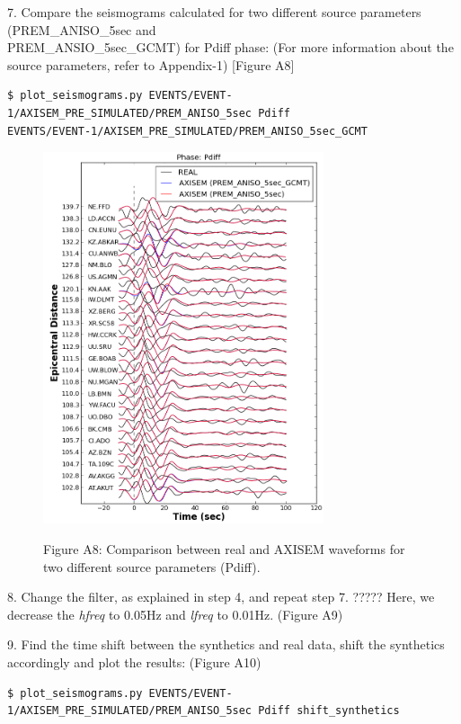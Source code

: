 \documentclass{article}
\begin{document}
7. Compare the seismograms calculated for two different source parameters (PREM\_ANISO\_5sec and \\
PREM\_ANSIO\_5sec\_GCMT) for Pdiff phase: (For more information about the source 
parameters, refer to Appendix-1) [Figure A8]

\begin{lstlisting}
$ plot_seismograms.py EVENTS/EVENT-1/AXISEM_PRE_SIMULATED/PREM_ANISO_5sec Pdiff 
EVENTS/EVENT-1/AXISEM_PRE_SIMULATED/PREM_ANISO_5sec_GCMT
\end{lstlisting}

\begin{figure}
\centering
\includegraphics[width=234pt, height=310pt, keepaspectratio=true]{AXISEMTutorial-fig014.png}
\begin{center}
{\small{}Figure A8: Comparison between real and AXISEM waveforms for two different 
source parameters (Pdiff).}
\end{center}
\end{figure}

8. Change the filter, as explained in step 4, and repeat step 7. ????? Here, we decrease 
the \textit{hfreq} to 0.05Hz and \textit{lfreq} to 0.01Hz. (Figure A9)

9. Find the time shift between the synthetics and real data, shift the synthetics 
accordingly and plot the results: (Figure A10)

\begin{lstlisting}
$ plot_seismograms.py EVENTS/EVENT-1/AXISEM_PRE_SIMULATED/PREM_ANISO_5sec Pdiff shift_synthetics
\end{lstlisting}
\end{document}
